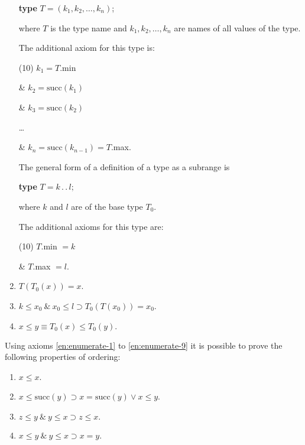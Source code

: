 \begin{enumerate}[wide, nosep, label=(\arabic*)]
	\quad \textbf{type} $T = (k_1, k_2, \dots, k_n)$;

	\noindent
	where $T$ is the type name and $k_1, k_2 , \dots, k_n$ are names of all values of the type.
	
	The additional axiom for this type is:
	
	\tabto*{.9em}(10) $k_1 = T$.min
	
	\tabto*{1.8em}\& $k_2 = \text{succ}(k_1)$
	
	\tabto*{1.8em}\& $k_3 = \text{succ}(k_2)$
	
	\tabto*{3.8em}\dots
	
	\tabto*{1.8em}\& $k_n = \text{succ}(k_{n-1}) = T$.max.
	
	The general form of a definition of a type as a subrange is
	
	\quad \textbf{type} $T=k\,.\,.\,l;$
	
	\noindent
	where $k$ and $l$ are of the base type $T_0$.
	
	The additional axioms for this type are:
	
	\tabto*{.9em}(10) $T$.min $= k$
	
	\tabto*{1.8em}\& $T$.max $= l$.

	\setcounter{enumi}{10}
	\item $T(T_0(x)) = x$.

	\item $k \leqslant x_0\ \&\ x_0 \leqslant l \supset T_0(T(x_0)) = x_0$.

	\item $x \leqslant y \equiv T_0(x) \leqslant T_0(y).$
\end{enumerate}

Using axioms \ref{en:enumerate-1} to \ref{en:enumerate-9} it is possible to prove the following properties of ordering:

\begin{enumerate}[wide, nosep, label=(T\arabic*)]
	\item $x \leqslant x$.

	\item \label{en:enumeration-axiom-2}
	$x \leqslant \text{succ}(y) \supset x = \text{succ}(y) \vee x \leqslant y$.
	
	\item \label{en:enumeration-axiom-3}
	$z \leqslant y\ \&\ y \leqslant x \supset z \leqslant x.$
	
	\item $x \leqslant y\ \&\ y \leqslant x \supset x = y.$
\end{enumerate}

